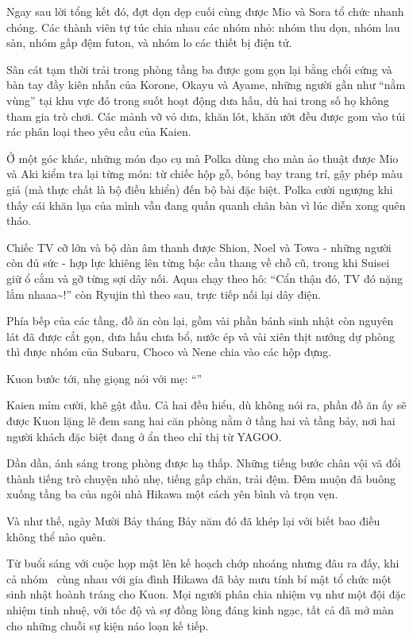 \documentclass[../main.tex]{subfiles}
\begin{document}
Ngay sau lời tổng kết đó, đợt dọn dẹp cuối cùng được Mio và Sora tổ chức nhanh chóng. Các thành viên tự túc chia nhau các nhóm nhỏ: nhóm thu dọn, nhóm lau sàn, nhóm gấp đệm futon, và nhóm lo các thiết bị điện tử.

Sân cát tạm thời trải trong phòng tầng ba được gom gọn lại bằng chổi cứng và bàn tay đầy kiên nhẫn của Korone, Okayu và Ayame, những người gần như ``nằm vùng'' tại khu vực đó trong suốt hoạt động dưa hấu, dù hai trong số họ không tham gia trò chơi. Các mảnh vỡ vỏ dưa, khăn lót, khăn ướt đều được gom vào túi rác phân loại theo yêu cầu của Kaien.

Ở một góc khác, những món đạo cụ mà Polka dùng cho màn ảo thuật được Mio và Aki kiểm tra lại từng món: từ chiếc hộp gỗ, bóng bay trang trí, gậy phép màu giả (mà thực chất là bộ điều khiển) đến bộ bài đặc biệt. Polka cười ngượng khi thấy cái khăn lụa của mình vẫn đang quấn quanh chân bàn vì lúc diễn xong quên tháo.

Chiếc TV cỡ lớn và bộ dàn âm thanh được Shion, Noel và Towa - những người còn đủ sức - hợp lực khiêng lên từng bậc cầu thang về chỗ cũ, trong khi Suisei giữ ổ cắm và gỡ từng sợi dây nối. Aqua chạy theo hô: ``Cẩn thận đó, TV đó nặng lắm nhaaa\~{}!'' còn Ryujin thì theo sau, trực tiếp nối lại dây điện.

Phía bếp của các tầng, đồ ăn còn lại, gồm vài phần bánh sinh nhật còn nguyên lát đã được cắt gọn, dưa hấu chưa bổ, nước ép và vài xiên thịt nướng dự phòng thì được nhóm của Subaru, Choco và Nene chia vào các hộp đựng.

Kuon bước tới, nhẹ giọng nói với mẹ: ``''

Kaien mỉm cười, khẽ gật đầu. Cả hai đều hiểu, dù không nói ra, phần đồ ăn ấy sẽ được Kuon lặng lẽ đem sang hai căn phòng nằm ở tầng hai và tầng bảy, nơi hai người khách đặc biệt đang ở ẩn theo chỉ thị từ YAGOO.

Dần dần, ánh sáng trong phòng được hạ thấp. Những tiếng bước chân vội vã đổi thành tiếng trò chuyện nhỏ nhẹ, tiếng gấp chăn, trải đệm. Đêm muộn đã buông xuống tầng ba của ngôi nhà Hikawa một cách yên bình và trọn vẹn.

\il

Và như thế, ngày Mười Bảy tháng Bảy năm đó đã khép lại với biết bao điều không thể nào quên.

Từ buổi sáng với cuộc họp mật lên kế hoạch chớp nhoáng nhưng đâu ra đấy, khi cả nhóm \hll\ cùng nhau với gia đình Hikawa đã bày mưu tính bí mật tổ chức một sinh nhật hoành tráng cho Kuon. Mọi người phân chia nhiệm vụ như một đội đặc nhiệm tinh nhuệ, với tốc độ và sự đồng lòng đáng kinh ngạc, tất cả đã mở màn cho những chuỗi sự kiện náo loạn kế tiếp.
\end{document}
